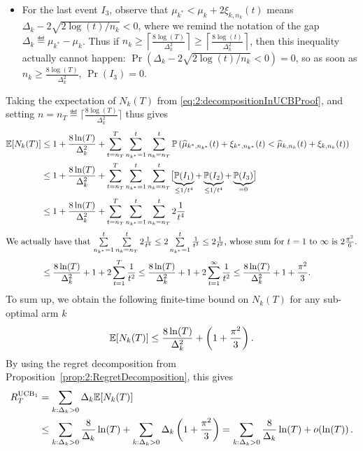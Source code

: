 \begin{smallproof}
\begin{itemize}
        \item
        For the last event $I_3$,
        observe that $\mu_{k^*} < \mu_k + 2 \xi_{k,n_k}(t)$ means $\Delta_k - 2 \sqrt{2\log(t) / n_k} < 0$, where we remind the notation of the gap $\Delta_k \eqdef \mu_{k^*} - \mu_k$.
        Thus if $n_k \geq \left\lceil \frac{8 \log(T)}{\Delta_k^2} \right\rceil \geq \left\lceil \frac{8 \log(t)}{\Delta_k^2} \right\rceil$,
        then this inequality actually cannot happen:
        $\Pr(\Delta_k - 2 \sqrt{2\log(t) / n_k} < 0) = 0$,
        so as soon as $n_k \geq \frac{8 \log(T)}{\Delta_k^2}$, $\Pr(I_3) = 0$.
    \end{itemize}
    Taking the expectation of $N_k(T)$ from \eqref{eq:2:decompositionInUCBProof},
    and setting $n = n_T \eqdef \lceil \frac{8 \log(T)}{\Delta_k^2} \rceil$ thus gives
    \begin{align}\label{eq:2:decompositionInUCBProof3}
        \mathbb{E}[ N_k(T) ]
        & \leq 1 + \frac{8 \ln(T)}{\Delta_k^2} + \sum_{t=n_T}^T \sum_{n_{k^*}=1}^t \sum_{n_{k}=n_T}^t  \mathbb{P}\left( \widehat{\mu}_{k^*,n_{k^*}}(t) + \xi_{k^*,n_{k^*}}(t) < \widehat{\mu}_{k,n_k}(t) + \xi_{k,n_k}(t) \right) \nonumber \\
        & \leq 1 + \frac{8 \ln(T)}{\Delta_k^2} + \sum_{t=n_T}^T \sum_{n_{k^*}=1}^t \sum_{n_{k}=n_T}^t \bigl[ \underbrace{\mathbb{P}(I_1)}_{\leq 1/t^4} + \underbrace{\mathbb{P}(I_2)}_{\leq 1/t^4} + \underbrace{\mathbb{P}(I_3)}_{=0} \bigr] \nonumber \\
        & \leq 1 + \frac{8 \ln(T)}{\Delta_k^2} + \sum_{t=n_T}^T \sum_{n_{k^*}=1}^t \sum_{n_{k}=n_T}^t  2 \frac{1}{t^4} \nonumber \\
        \intertext{We actually have that $\sum\limits_{n_{k^*}=1}^t \sum\limits_{n_{k}=n_T}^t  2 \frac{1}{t^4} \leq 2 \sum\limits_{n_{k^*}=1}^t \frac{1}{t^3} \leq 2 \frac{1}{t^2}$, whose sum for $t=1$ to $\infty$ is $2\frac{\pi^2}{6}$.}
        & \leq \frac{8 \ln(T)}{\Delta_k^2} + 1 + 2 \sum_{t=1}^T \frac{1}{t^2}
        \leq \frac{8 \ln(T)}{\Delta_k^2} + 1 + 2 \sum_{t=1}^{\infty} \frac{1}{t^2}
        \leq \frac{8 \ln(T)}{\Delta_k^2} + 1 + \frac{\pi^2}{3}.
    \end{align}
    To sum up, we obtain the following finite-time bound on $N_k(T)$ for any sub-optimal arm $k$
    \begin{align*}
        \mathbb{E}[N_k(T)] \leq \frac{8 \ln(T)}{\Delta_k^2} + \left(1 + \frac{\pi^2}{3}\right).
    \end{align*}
    By using the regret decomposition from Proposition~\ref{prop:2:RegretDecomposition}, this gives
    \begin{align*}
        R_T^{\mathrm{UCB}_1} &= \sum_{k: \Delta_k>0} \Delta_k \mathbb{E}[N_k(T)] \\
        & \leq \sum_{k: \Delta_k>0} \frac{8}{\Delta_k} \ln(T) + \sum_{k: \Delta_k>0} \Delta_k \left( 1 + \frac{\pi^2}{3} \right)
        = \sum_{k: \Delta_k>0} \frac{8}{\Delta_k} \ln(T) + \mathop{}\mathopen{}o\mathopen{}\left(\ln(T)\right).
    \end{align*}
\end{smallproof}

